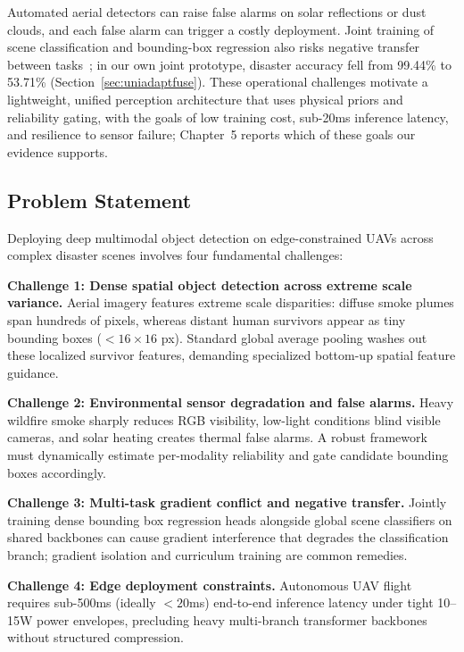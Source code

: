 \documentclass[journal]{IEEEtran}
\begin{document}
Automated aerial detectors can raise false alarms on solar reflections or dust clouds, and each false alarm can trigger a costly deployment. Joint training of scene classification and bounding-box regression also risks negative transfer between tasks~\cite{yu2020gradient}; in our own joint prototype, disaster accuracy fell from 99.44\% to 53.71\% (Section~\ref{sec:uniadaptfuse}). These operational challenges motivate a lightweight, unified perception architecture that uses physical priors and reliability gating, with the goals of low training cost, sub-20ms inference latency, and resilience to sensor failure; Chapter~5 reports which of these goals our evidence supports.

\subsection{Problem Statement}

Deploying deep multimodal object detection on edge-constrained UAVs across complex disaster scenes involves four fundamental challenges:

\textbf{Challenge 1: Dense spatial object detection across extreme scale variance.} Aerial imagery features extreme scale disparities: diffuse smoke plumes span hundreds of pixels, whereas distant human survivors appear as tiny bounding boxes ($<16\times16$ px). Standard global average pooling washes out these localized survivor features, demanding specialized bottom-up spatial feature guidance.

\textbf{Challenge 2: Environmental sensor degradation and false alarms.} Heavy wildfire smoke sharply reduces RGB visibility, low-light conditions blind visible cameras, and solar heating creates thermal false alarms. A robust framework must dynamically estimate per-modality reliability and gate candidate bounding boxes accordingly.

\textbf{Challenge 3: Multi-task gradient conflict and negative transfer.} Jointly training dense bounding box regression heads alongside global scene classifiers on shared backbones can cause gradient interference that degrades the classification branch; gradient isolation and curriculum training are common remedies.

\textbf{Challenge 4: Edge deployment constraints.} Autonomous UAV flight requires sub-500ms (ideally $<20$ms) end-to-end inference latency under tight 10--15W power envelopes, precluding heavy multi-branch transformer backbones without structured compression.
\end{document}
